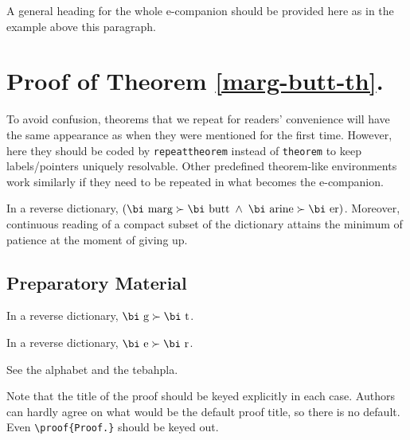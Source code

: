 \documentclass[mnsc,blindrev]{informs3} %
\begin{document}
\ECSwitch



A general heading for the whole e-companion should be provided here as in the example above this paragraph.

\section{Proof of Theorem \ref{marg-butt-th}.}

To avoid confusion, theorems that we repeat for readers' convenience
will have the same appearance as when they were mentioned for the first
time. However, here they should be coded by \verb+repeattheorem+ instead
of \verb+theorem+ to keep labels/pointers uniquely resolvable. Other predefined theorem-like
environments work similarly if they need to be repeated in what becomes the \mbox{e-companion.}


\begin{repeattheorem}[Theorem 1.]
In a reverse dictionary, $(\mbox{\bi marg}\succ\mbox{\bi butt\/}\; \land\;  
\mbox{\bi arine}\succ\mbox{\bi er})$.
Moreover, continuous reading of a compact subset of the dictionary
attains the minimum of patience at the moment of giving up.
\end{repeattheorem}

\subsection{Preparatory Material}

\begin{lemma}
\label{aux-lem1}
In a reverse dictionary, $\mbox{\bi g}\succ\mbox{\bi t\/}$.
\end{lemma}

\begin{lemma}
\label{aux-lem2}
In a reverse dictionary, $\mbox{\bi e}\succ\mbox{\bi r\/}$.
\end{lemma}

 See the alphabet and the tebahpla.\Halmos
\endproof

\begin{remark} 
Note that the title of the proof should be keyed
explicitly in each case. Authors can hardly agree on what would be the
default proof title, so there is no default. Even \verb+\proof{Proof.}+ should be keyed out. 
\end{remark}
\end{document}
